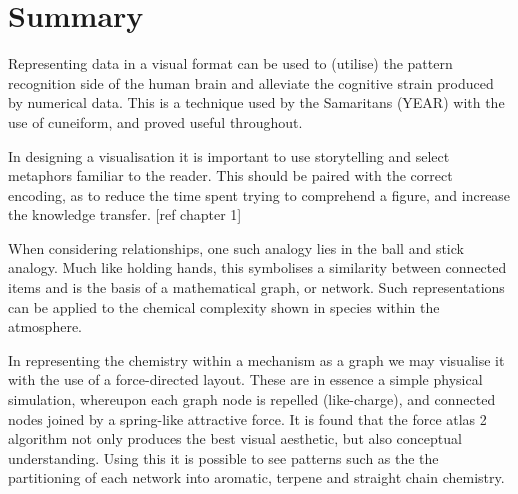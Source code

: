 % 
% 
% 
% 
% 
% 



\section{Summary}
Representing data in a visual format can be used to (utilise) the pattern recognition side of the human brain and alleviate the cognitive strain produced by numerical data. This is a technique used by the Samaritans (YEAR) with the use of cuneiform, and proved useful throughout. 

In designing a visualisation it is important to use storytelling and select metaphors familiar to the reader. This should be paired with the correct encoding, as to reduce the time spent trying to comprehend a figure, and increase the knowledge transfer. [ref chapter 1]

When considering relationships, one such analogy lies in the ball and stick analogy. Much like holding hands, this symbolises a similarity between connected items and is the basis of a mathematical graph, or network. Such representations can be applied to the chemical complexity shown in species within the atmosphere. 

In representing the chemistry within a mechanism as a graph we may visualise it with the use of a force-directed layout. These are in essence a simple physical simulation, whereupon each graph node is repelled (like-charge), and connected nodes joined by a spring-like attractive force. It is found that the force atlas 2 algorithm not only produces the best visual aesthetic, but also conceptual understanding. Using this it is possible to see patterns such as the the partitioning of each network into aromatic, terpene and straight chain chemistry. 

